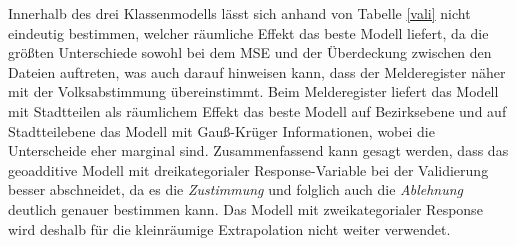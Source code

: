 \documentclass{Vorlage}
\begin{document}
Innerhalb des drei Klassenmodells lässt sich anhand von Tabelle \ref{vali} nicht eindeutig bestimmen, welcher räumliche Effekt das beste Modell liefert, da die größten Unterschiede sowohl bei dem MSE und der Überdeckung zwischen den Dateien auftreten, was auch darauf hinweisen kann, dass der Melderegister näher mit der Volksabstimmung übereinstimmt. Beim Melderegister liefert das Modell mit Stadtteilen als räumlichem Effekt das beste Modell auf Bezirksebene und auf Stadtteilebene das Modell mit Gauß-Krüger Informationen, wobei die Unterscheide eher marginal sind. Zusammenfassend kann gesagt werden, dass das geoadditive Modell mit dreikategorialer Response-Variable bei der Validierung besser abschneidet, da es die \textit{Zustimmung} und folglich auch die \textit{Ablehnung} deutlich genauer bestimmen kann. Das Modell mit zweikategorialer Response wird deshalb für die kleinräumige Extrapolation nicht weiter verwendet.
\end{document}
